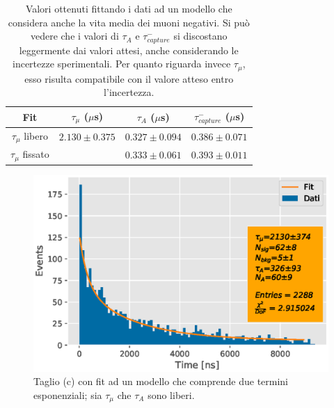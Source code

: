 \documentclass{standalone}
\begin{document}
\begin{table}[H]
  \centering
  \begin{tabular}{c|c|c|c}
    \hline
    \hline
    Fit & $\tau_{\mu}$ ($\mu$s) & $\tau_{A}$ ($\mu$s) & $\tau^{-}_{capture}$ ($\mu$s) \\
    \hline
    \hline
    $\tau_{\mu}$ libero & $2.130 \pm 0.375$ & $0.327 \pm 0.094$ & $0.386 \pm 0.071$\\
    $\tau_{\mu}$ fissato & & $0.333 \pm 0.061$ & $0.393 \pm 0.011$ \\
    \hline
    \hline
  \end{tabular}
  \caption{Valori ottenuti fittando i dati ad un modello che considera anche la vita media dei muoni negativi. Si pu\`o vedere che i valori di $\tau_{A}$ e $\tau_{capture}^{-}$ si discostano leggermente dai valori attesi, anche considerando le incertezze sperimentali. Per quanto riguarda invece $\tau_{\mu}$, esso risulta compatibile con il valore atteso entro l'incertezza.}
  \label{tab:negative_muon}
\end{table}

\begin{figure}[H]
  \centering
  \includegraphics[width=\textwidth]{plots/soft_doubleexp.eps}
  \caption{Taglio (c) con fit ad un modello che comprende due termini esponenziali; sia $\tau_{\mu}$ che $\tau_{A}$ sono liberi.}
  \label{fig:soft_doubleexp}
\end{figure}
\end{document}
